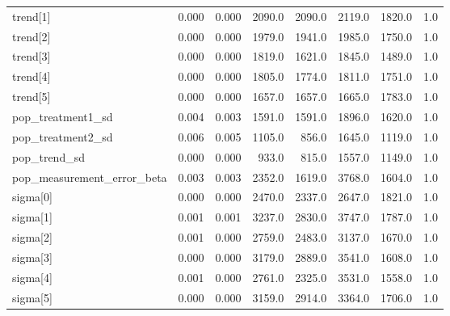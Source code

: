 \begin{tabular}{lrrrrrrr}
trend[1]                   &      0.000 &    0.000 &    2090.0 &  2090.0 &    2119.0 &    1820.0 &    1.0 \\
trend[2]                   &      0.000 &    0.000 &    1979.0 &  1941.0 &    1985.0 &    1750.0 &    1.0 \\
trend[3]                   &      0.000 &    0.000 &    1819.0 &  1621.0 &    1845.0 &    1489.0 &    1.0 \\
trend[4]                   &      0.000 &    0.000 &    1805.0 &  1774.0 &    1811.0 &    1751.0 &    1.0 \\
trend[5]                   &      0.000 &    0.000 &    1657.0 &  1657.0 &    1665.0 &    1783.0 &    1.0 \\
pop\_treatment1\_sd          &      0.004 &    0.003 &    1591.0 &  1591.0 &    1896.0 &    1620.0 &    1.0 \\
pop\_treatment2\_sd          &      0.006 &    0.005 &    1105.0 &   856.0 &    1645.0 &    1119.0 &    1.0 \\
pop\_trend\_sd               &      0.000 &    0.000 &     933.0 &   815.0 &    1557.0 &    1149.0 &    1.0 \\
pop\_measurement\_error\_beta &      0.003 &    0.003 &    2352.0 &  1619.0 &    3768.0 &    1604.0 &    1.0 \\
sigma[0]                   &      0.000 &    0.000 &    2470.0 &  2337.0 &    2647.0 &    1821.0 &    1.0 \\
sigma[1]                   &      0.001 &    0.001 &    3237.0 &  2830.0 &    3747.0 &    1787.0 &    1.0 \\
sigma[2]                   &      0.001 &    0.000 &    2759.0 &  2483.0 &    3137.0 &    1670.0 &    1.0 \\
sigma[3]                   &      0.000 &    0.000 &    3179.0 &  2889.0 &    3541.0 &    1608.0 &    1.0 \\
sigma[4]                   &      0.001 &    0.000 &    2761.0 &  2325.0 &    3531.0 &    1558.0 &    1.0 \\
sigma[5]                   &      0.000 &    0.000 &    3159.0 &  2914.0 &    3364.0 &    1706.0 &    1.0 \\
\bottomrule
\end{tabular}
